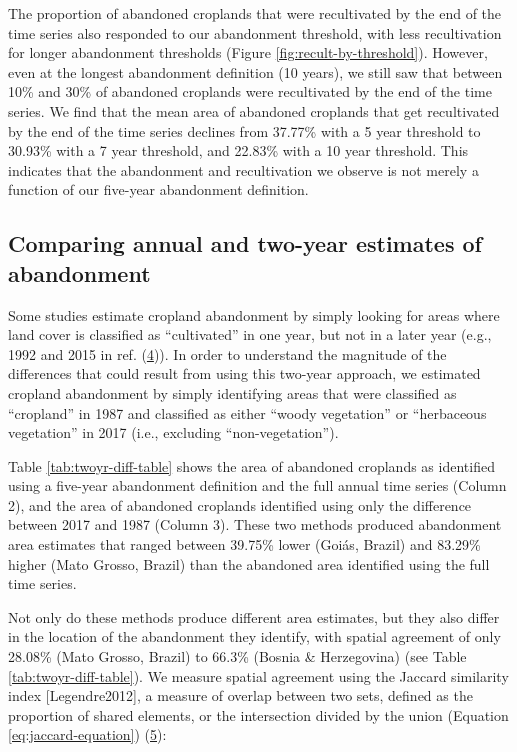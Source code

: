 \documentclass[9pt,lineno]{pnas-new}
\begin{document}
The proportion of abandoned croplands that were recultivated by the end of the time series also responded to our abandonment threshold, with less recultivation for longer abandonment thresholds (Figure \ref{fig:recult-by-threshold}).
However, even at the longest abandonment definition (10 years), we still saw that between 10\% and 30\% of abandoned croplands were recultivated by the end of the time series.
We find that the mean area of abandoned croplands that get recultivated by the end of the time series declines from 37.77\% with a 5 year threshold to 30.93\% with a 7 year threshold, and 22.83\% with a 10 year threshold.
This indicates that the abandonment and recultivation we observe is not merely a function of our five-year abandonment definition.

\hypertarget{twoyr-vs-annual}{%
\subsection{Comparing annual and two-year estimates of abandonment}\label{twoyr-vs-annual}}

Some studies estimate cropland abandonment by simply looking for areas where land cover is classified as ``cultivated'' in one year, but not in a later year (e.g., 1992 and 2015 in ref. (\protect\hyperlink{ref-Naess2021}{4})).
In order to understand the magnitude of the differences that could result from using this two-year approach, we estimated cropland abandonment by simply identifying areas that were classified as ``cropland'' in 1987 and classified as either ``woody vegetation'' or ``herbaceous vegetation'' in 2017 (i.e., excluding ``non-vegetation'').

Table \ref{tab:twoyr-diff-table} shows the area of abandoned croplands as identified using a five-year abandonment definition and the full annual time series (Column 2), and the area of abandoned croplands identified using only the difference between 2017 and 1987 (Column 3).
These two methods produced abandonment area estimates that ranged between 39.75\% lower (Goiás, Brazil) and 83.29\% higher (Mato Grosso, Brazil) than the abandoned area identified using the full time series.

Not only do these methods produce different area estimates, but they also differ in the location of the abandonment they identify, with spatial agreement of only 28.08\% (Mato Grosso, Brazil) to 66.3\% (Bosnia \& Herzegovina) (see Table \ref{tab:twoyr-diff-table}).
We measure spatial agreement using the Jaccard similarity index {[}Legendre2012{]}, a measure of overlap between two sets, defined as the proportion of shared elements, or the intersection divided by the union (Equation \eqref{eq:jaccard-equation}) (\protect\hyperlink{ref-Legendre2012}{5}):
\end{document}
